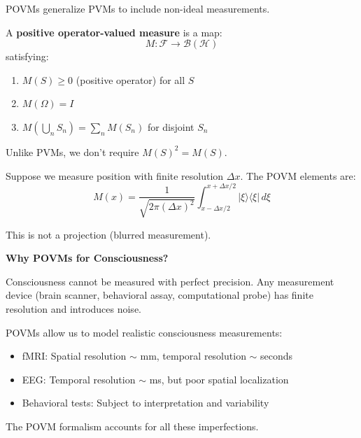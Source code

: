 POVMs generalize PVMs to include non-ideal measurements.

\begin{definition}[POVM]\label{def:povm}
A \textbf{positive operator-valued measure} is a map:
\begin{equation}
M: \mathcal{F} \to \mathcal{B}(\mathcal{H})
\end{equation}
satisfying:
\begin{enumerate}
\item $M(S) \geq 0$ (positive operator) for all $S$
\item $M(\Omega) = I$
\item $M(\bigcup_n S_n) = \sum_n M(S_n)$ for disjoint $S_n$
\end{enumerate}

Unlike PVMs, we don't require $M(S)^2 = M(S)$.
\end{definition}

\begin{example}\label{ex:imprecise-position}
Suppose we measure position with finite resolution $\Delta x$. The POVM elements are:
\begin{equation}
M(x) = \frac{1}{\sqrt{2\pi(\Delta x)^2}} \int_{x - \Delta x/2}^{x + \Delta x/2} |\xi\rangle\langle \xi| \, d\xi
\end{equation}

This is not a projection (blurred measurement).
\end{example}

\begin{level2}
\textbf{Why POVMs for Consciousness?}

Consciousness cannot be measured with perfect precision. Any measurement device (brain scanner, behavioral assay, computational probe) has finite resolution and introduces noise.

POVMs allow us to model realistic consciousness measurements:
\begin{itemize}
\item fMRI: Spatial resolution $\sim$ mm, temporal resolution $\sim$ seconds
\item EEG: Temporal resolution $\sim$ ms, but poor spatial localization
\item Behavioral tests: Subject to interpretation and variability
\end{itemize}

The POVM formalism accounts for all these imperfections.
\end{level2}

